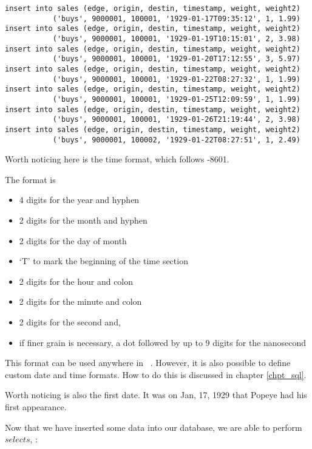 \begin{sqlcode}
\begin{lstlisting}
insert into sales (edge, origin, destin, timestamp, weight, weight2)
           ('buys', 9000001, 100001, '1929-01-17T09:35:12', 1, 1.99)
insert into sales (edge, origin, destin, timestamp, weight, weight2)
           ('buys', 9000001, 100001, '1929-01-19T10:15:01', 2, 3.98)
insert into sales (edge, origin, destin, timestamp, weight, weight2)
           ('buys', 9000001, 100001, '1929-01-20T17:12:55', 3, 5.97)
insert into sales (edge, origin, destin, timestamp, weight, weight2)
           ('buys', 9000001, 100001, '1929-01-22T08:27:32', 1, 1.99)
insert into sales (edge, origin, destin, timestamp, weight, weight2)
           ('buys', 9000001, 100001, '1929-01-25T12:09:59', 1, 1.99)
insert into sales (edge, origin, destin, timestamp, weight, weight2)
           ('buys', 9000001, 100001, '1929-01-26T21:19:44', 2, 3.98)
insert into sales (edge, origin, destin, timestamp, weight, weight2)
           ('buys', 9000001, 100002, '1929-01-22T08:27:51', 1, 2.49)
\end{lstlisting}
\end{sqlcode}

Worth noticing here is the time format,
which follows -8601.

The format is
\begin{itemize}
\item 4 digits for the year and hyphen
\item 2 digits for the month and hyphen
\item 2 digits for the day of month
\item `T' to mark the beginning of the time section
\item 2 digits for the hour and colon
\item 2 digits for the minute and colon
\item 2 digits for the second and,
\item if finer grain is necessary,
a dot followed by up to 9 digits
for the nanosecond
\end{itemize}

This format can be used anywhere in \nowdb\ \sql.
However, it is also possible to define custom
date and time formats. How to do this is discussed
in chapter \ref{chpt_sql}.

Worth noticing is also the first date.
It was on Jan, 17, 1929 that Popeye had his first
appearance.

Now that we have inserted some data
into our database, we are able to perform $selects$, \eg:

